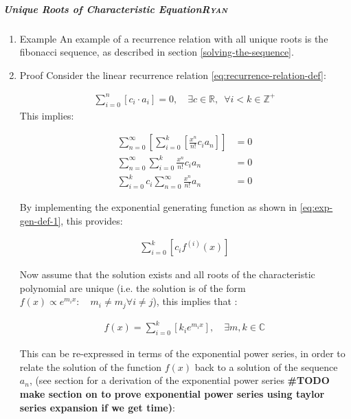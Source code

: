\documentclass[a4paper,11pt,twoside]{article}
\begin{document}
\subparagraph{Unique Roots of Characteristic Equation\hfill{}\textsc{Ryan}}
\label{uniq-roots-recurrence}
\begin{enumerate}
\item Example
\label{sec:org42f591b}
An example of a recurrence relation with all unique roots is the fibonacci sequence, as described in section \ref{solving-the-sequence}.
\item Proof
\label{sec:org0ef281c}
Consider the linear recurrence relation \eqref{eq:recurrence-relation-def}:

\begin{align}
\sum^{n}_{i= 0}   \left[ c_i \cdot  a_i \right] = 0, \quad \exists c \in
\mathbb{R}, \enspace \forall i<k\in\mathbb{Z}^+ \nonumber \label{eq:recurrence-relation-def}
\end{align}
This implies:


\begin{align}
    \sum^{\infty}_{n= 0}   \left[ \sum^{k}_{i= 0}   \left[ \frac{x^n}{n!} c_i a_n \right]  \right]  &= 0 \\
    \sum^{\infty}_{n= 0}    \sum^{k}_{i= 0}    \frac{x^n}{n!} c_i a_n    &= 0 \\
        \sum^{k}_{i= 0} c_i \sum^{\infty}_{n= 0}    \frac{x^n}{n!}  a_n    &= 0
\end{align}

By implementing the exponential generating function as shown in
\eqref{eq:exp-gen-def-1}, this provides:

\begin{align}
   \sum^{k}_{i= 0}   \left[ c_i f^{\left( i \right)}\left( x \right) \right]
\end{align}


Now assume that the solution exists and all roots of the characteristic polynomial are unique (i.e. the solution is of the form \(f{\left({ x }\right)} \propto e^{m_i x}: \quad m_i \neq m_j \forall i\neq j\)), this implies that  \cite[Ch. 4]{zillDifferentialEquations2009a} :

\begin{align}
    f{\left({ x }\right)} = \sum^{k}_{i= 0}   {\left[{ k_i e^{m_i x} }\right]}, \quad \exists m,k \in \mathbb{C} \nonumber
\end{align}

This can be re-expressed in terms of the exponential power series, in order to relate the solution of the function \(f{\left({ x }\right)}\) back to a solution of the sequence \(a_n\), (see section for a derivation of the exponential power series \textbf{\#TODO make section on to prove exponential power series using taylor series expansion if we get time)}:


\end{enumerate}
\end{document}
